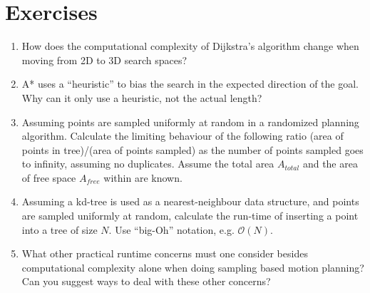 \section*{Exercises}\small
\begin{enumerate}
\item How does the computational complexity of Dijkstra's algorithm change when moving from 2D to 3D search spaces?
\item A* uses a ``heuristic'' to bias the search in the expected direction of the goal. Why can it only use a heuristic, not the actual length?
\item Assuming points are sampled uniformly at random in a randomized planning algorithm. Calculate the limiting behaviour of the following ratio (area of points in tree)/(area of points sampled) as the number of points sampled goes to infinity, assuming no duplicates. Assume the total area $A_{total}$ and the area of free space $A_{free}$ within are known.

\item Assuming a kd-tree is used as a nearest-neighbour data structure, and points are sampled uniformly at random, calculate the  run-time of inserting a point into a tree of size $N$. Use ``big-Oh'' notation, e.g. $\mathcal{O}(N)$.

\item What other practical runtime concerns must one consider besides computational complexity alone when doing sampling based motion planning? Can you suggest ways to deal with these other concerns?


\end{enumerate}
